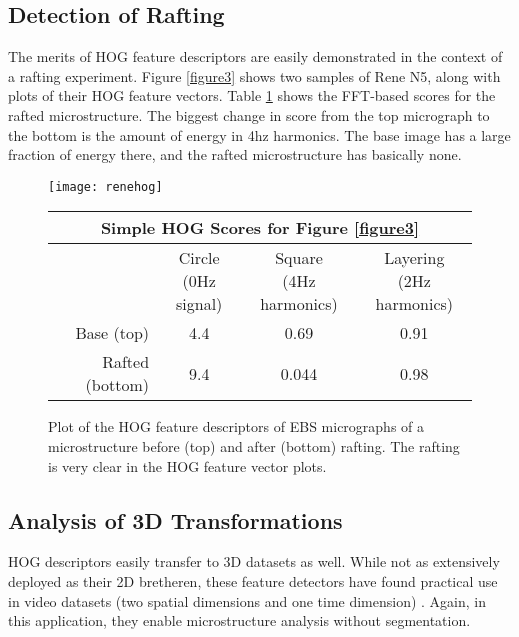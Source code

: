 \documentclass[review]{elsarticle}
\begin{document}
	\subsection{Detection of Rafting}
	The merits of HOG feature descriptors are easily demonstrated in the context of a rafting experiment. Figure \ref{figure3} shows two samples of Rene N5, along with plots of their HOG feature vectors. Table \ref{table2} shows the FFT-based scores for the rafted microstructure. The biggest change in score from the top micrograph to the bottom is the amount of energy in 4hz harmonics. The base image has a large fraction of energy there, and the rafted microstructure has basically none.
	
	\begin{figure}[!ht]
		\begin{center}
			\texttt{[image: renehog]}
	  		\caption{ Plot of the HOG feature descriptors of EBS micrographs of a microstructure before (top) and after (bottom) rafting. The rafting is very clear in the HOG feature vector plots. }
	  		\label{figure3}
  		
			\begin{tabular}{ r | c | c | c }
				\multicolumn{4}{c}{Simple HOG Scores for Figure \ref{figure3}} \\
				\hline
				& \shortstack{Circle \\ (0Hz signal)} & \shortstack{Square \\ (4Hz harmonics)} & \shortstack{Layering \\ (2Hz harmonics)} \\
				\hline
				Base (top) & 4.4 & 0.69 & 0.91 \\
				Rafted (bottom) & 9.4 & 0.044 & 0.98 \\
				\hline
			\end{tabular}
			
	  		\label{table2}
		\end{center}
	\end{figure}
	
	\subsection{Analysis of 3D Transformations}
	HOG descriptors easily transfer to 3D datasets as well. While not as extensively deployed as their 2D bretheren, these feature detectors have found practical use in video datasets (two spatial dimensions and one time dimension) \cite{hog3d1}. Again, in this application, they enable microstructure analysis without segmentation.
\end{document}
